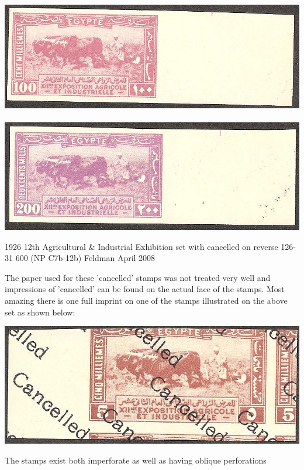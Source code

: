 \documentclass[justified]{tufte-book}
\begin{document}
\begin{fullwidth}
\hbox{\includegraphics[scale=1.1]{./graphics/EG/SG130-cancelled} \includegraphics[scale=1.1]{./graphics/EG/SG131-cancelled}}
\bigskip
\end{fullwidth}
1926 12th Agricultural \& Industrial Exhibition set with cancelled on reverse 126-31 600 (NP C7b-12b) Feldman April 2008

The paper used for these 'cancelled' stamps was not treated very well and impressions of 'cancelled' can be found on the actual face of the stamps. Most amazing there is one full imprint on one of the stamps illustrated on the above set as shown below:

\begin{center}
\includegraphics[scale=1.3]{./graphics/EG/SG126-cancelled-back}
\end{center}

The stamps exist both imperforate as well as having oblique perforations
\end{document}
